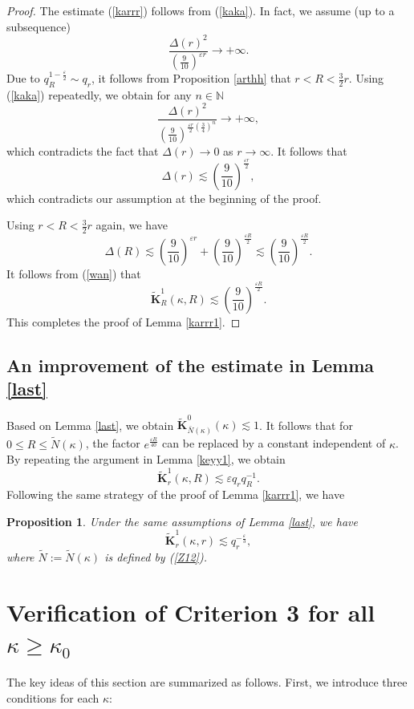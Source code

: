 \documentclass{amsart}
\newtheorem{Proposition}[Definition]{Proposition}
\theoremstyle{definition}
\begin{document}
\begin{proof}
The estimate (\ref{karrr}) follows from (\ref{kaka}). In fact, we assume (up to a subsequence)
\[\frac{\Delta(r)^2}{(\frac{9}{10})^{\varepsilon r}}\to +\infty.\]
Due to $q_R^{1-\frac{\varepsilon}{2}}\sim q_r$, it follows from Proposition \ref{arthh} that $r<R<\frac{3}{2}r$. Using (\ref{kaka}) repeatedly, we obtain for any $n\in \mathbb{N}$
\[\frac{\Delta(r)^2}{(\frac{9}{10})^{\frac{\varepsilon r}{2}(\frac{3}{4})^n}}\to +\infty,\]
which contradicts the fact that $\Delta(r)\to 0$ as $r\to \infty$. It follows that
\[\Delta(r)\lesssim (\frac{9}{10})^{\frac{\varepsilon r}{2}},\]
which contradicts our assumption at the beginning of the proof.

Using $r<R<\frac{3}{2}r$ again,  we have
\[\Delta(R)\lesssim (\frac{9}{10})^{\varepsilon r}+(\frac{9}{10})^{\frac{\varepsilon R}{2}}\lesssim (\frac{9}{10})^{\frac{\varepsilon R}{2}}.\]
{It follows from (\ref{wan}) that}
\[\widetilde{\mathbf{K}}_R^1(\kappa,R)\lesssim (\frac{9}{10})^{\frac{\varepsilon R}{2}}.\]
This completes the proof of Lemma \ref{karrr1}.
\end{proof}
\subsection{An improvement of the estimate in Lemma \ref{last} }
Based on Lemma \ref{last}, we obtain $\widetilde{\mathbf{K}}_{\bar{N}(\kappa)}^0(\kappa)\lesssim 1$.  It follows that for $0\leq R\leq \tilde{N}(\kappa)$,  the factor $e^{\frac{\varepsilon R}{40}}$ can be replaced by a constant independent of $\kappa$. By repeating the argument in Lemma \ref{keyy1}, we obtain
\[\widetilde{\mathbf{K}}_r^1(\kappa,R)\lesssim \varepsilon q_rq_R^{-1}.\]
Following the same strategy of the proof of Lemma \ref{karrr1}, we have



\begin{Proposition}\label{L1}
	Under the same assumptions of Lemma \ref{last}, we have
	\[\widetilde{\mathbf{K}}_{r}^1(\kappa,r)\lesssim q_r^{-\frac{\varepsilon}{3}},\]
	where $\tilde{N}:=\tilde{N}(\kappa)$ is defined by (\ref{Z12}).
\end{Proposition}


\vspace{2em}


\section{Verification of Criterion 3 for all $\kappa\geq \kappa_0$}\label{S5}
The key ideas of this section are summarized as follows. First, we introduce three  conditions for each $\kappa$:
\end{document}
